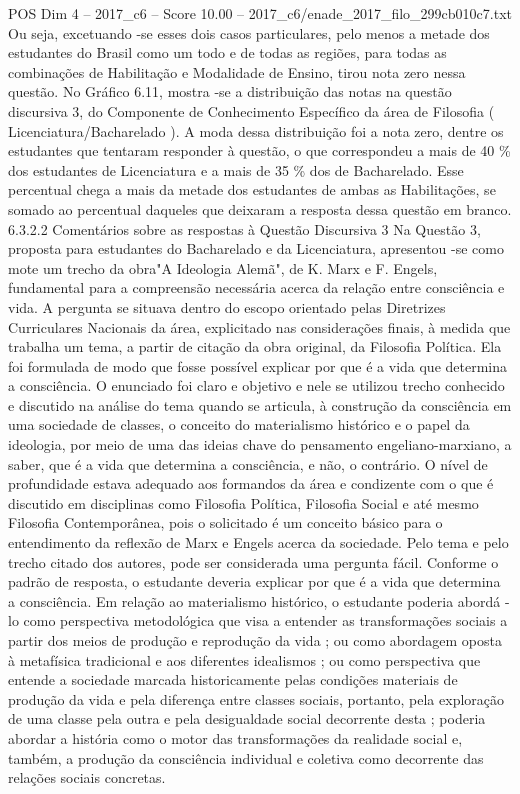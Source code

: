 \begin{textsample}{POS Dim 4 – 2017\_c6 – Score 10.00 – 2017\_c6/enade\_2017\_filo\_299cb010c7.txt}
Ou seja, excetuando -se esses dois casos particulares, pelo menos a metade dos estudantes do Brasil como um todo e de todas as regiões, para todas as combinações de Habilitação e Modalidade de Ensino, tirou nota zero nessa questão.
No Gráfico 6.11, mostra -se a distribuição das notas na questão discursiva 3, do Componente de Conhecimento Específico da área de Filosofia ( Licenciatura/Bacharelado ).
A moda dessa distribuição foi a nota zero, dentre os estudantes que tentaram responder à questão, o que correspondeu a mais de 40 \% dos estudantes de Licenciatura e a mais de 35 \% dos de Bacharelado.
Esse percentual chega a mais da metade dos estudantes de ambas as Habilitações, se somado ao percentual daqueles que deixaram a resposta dessa questão em branco. 6.3.2.2 Comentários sobre as respostas à Questão Discursiva 3 Na Questão 3, proposta para estudantes do Bacharelado e da Licenciatura, apresentou -se como mote um trecho da obra"A Ideologia Alemã", de K.
Marx e F.
Engels, fundamental para a compreensão necessária acerca da relação entre consciência e vida.
A pergunta se situava dentro do escopo orientado pelas Diretrizes Curriculares Nacionais da área, explicitado nas considerações finais, à medida que trabalha um tema, a partir de citação da obra original, da Filosofia Política.
Ela foi formulada de modo que fosse possível explicar por que é a vida que determina a consciência.
O enunciado foi claro e objetivo e nele se utilizou trecho conhecido e discutido na análise do tema quando se articula, à construção da consciência em uma sociedade de classes, o conceito do materialismo histórico e o papel da ideologia, por meio de uma das ideias chave do pensamento engeliano-marxiano, a saber, que é a vida que determina a consciência, e não, o contrário.
O nível de profundidade estava adequado aos formandos da área e condizente com o que é discutido em disciplinas como Filosofia Política, Filosofia Social e até mesmo Filosofia Contemporânea, pois o solicitado é um conceito básico para o entendimento da reflexão de Marx e Engels acerca da sociedade.
Pelo tema e pelo trecho citado dos autores, pode ser considerada uma pergunta fácil.
Conforme o padrão de resposta, o estudante deveria explicar por que é a vida que determina a consciência.
Em relação ao materialismo histórico, o estudante poderia abordá -lo como perspectiva metodológica que visa a entender as transformações sociais a partir dos meios de produção e reprodução da vida ; ou como abordagem oposta à metafísica tradicional e aos diferentes idealismos ; ou como perspectiva que entende a sociedade marcada historicamente pelas condições materiais de produção da vida e pela diferença entre classes sociais, portanto, pela exploração de uma classe pela outra e pela desigualdade social decorrente desta ; poderia abordar a história como o motor das transformações da realidade social e, também, a produção da consciência individual e coletiva como decorrente das relações sociais concretas.

\end{textsample}
